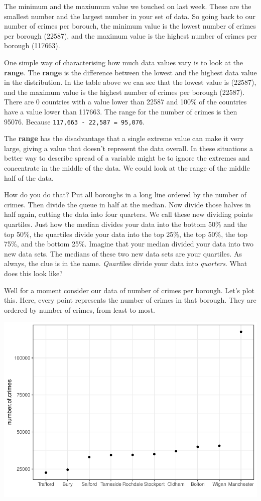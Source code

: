 \documentclass[
]{book}
\begin{document}
The minimum and the maxiumum value we touched on last week. These are the smallest number and the largest number in your set of data. So going back to our number of crimes per borouch, the minimum value is the lowest number of crimes per borough (22587), and the maximum value is the highest number of crimes per borough (117663).

One simple way of characterising how much data values vary is to look at the \textbf{range}. The \textbf{range} is the difference between the lowest and the highest data value in the distribution. In the table above we can see that the lowest value is (22587), and the maximum value is the highest number of crimes per borough (22587). There are 0 countries with a value lower than 22587 and 100\% of the countries have a value lower than 117663. The range for the number of crimes is then 95076. Because \texttt{117,663\ -\ 22,587\ =\ 95,076}.

The \textbf{range} has the disadvantage that a single extreme value can make it very large, giving a value that doesn't represent the data overall. In these situations a better way to describe spread of a variable might be to ignore the extremes and concentrate in the middle of the data. We could look at the range of the middle half of the data.

How do you do that? Put all boroughs in a long line ordered by the number of crimes. Then divide the queue in half at the median. Now divide those halves in half again, cutting the data into four quarters. We call these new dividing points quartiles. Just how the median divides your data into the bottom 50\% and the top 50\%, the quartiles divide your data into the top 25\%, the top 50\%, the top 75\%, and the bottom 25\%. Imagine that your median divided your data into two new data sets. The medians of these two new data sets are your quartiles. As always, the clue is in the name. \emph{Quart}iles divide your data into \emph{quarters}. What does this look like?

Well for a moment consider our data of number of crimes per borough. Let's plot this. Here, every point represents the number of crimes in that borough. They are ordered by number of crimes, from least to most.

\includegraphics{bookdown-demo_files/figure-latex/unnamed-chunk-24-1.pdf}
\end{document}
